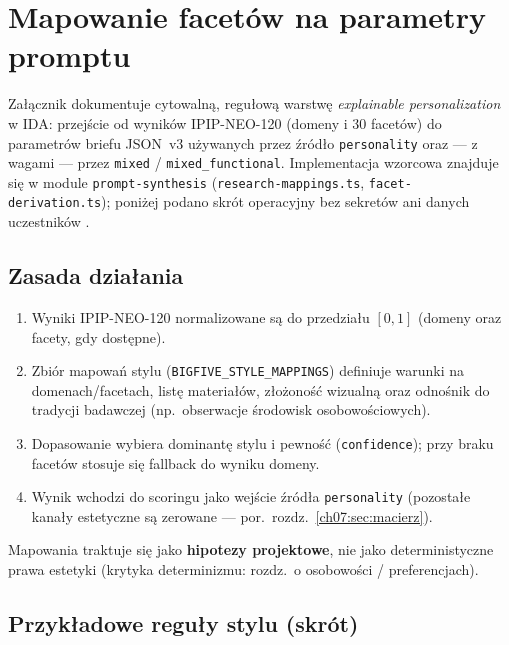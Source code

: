 \chapter{Mapowanie facetów na parametry promptu}
\label{app:c:top}

Załącznik dokumentuje cytowalną, regułową warstwę \emph{explainable personalization} w IDA: przejście od wyników IPIP-NEO-120 (domeny i 30 facetów) do parametrów briefu JSON~v3 używanych przez źródło \texttt{personality} oraz --- z wagami --- przez \texttt{mixed} / \texttt{mixed\_functional}. Implementacja wzorcowa znajduje się w module \texttt{prompt-synthesis} (\texttt{research-mappings.ts}, \texttt{facet-derivation.ts}); poniżej podano skrót operacyjny bez sekretów ani danych uczestników \parencite{idaPlatform2026}.

\section{Zasada działania}
\label{app:c:sec:zasada}

\begin{enumerate}
  \item Wyniki IPIP-NEO-120 normalizowane są do przedziału $[0,1]$ (domeny oraz facety, gdy dostępne).
  \item Zbiór mapowań stylu (\texttt{BIGFIVE\_STYLE\_MAPPINGS}) definiuje warunki na domenach/facetach, listę materiałów, złożoność wizualną oraz odnośnik do tradycji badawczej (np.\ obserwacje środowisk osobowościowych).
  \item Dopasowanie wybiera dominantę stylu i pewność (\texttt{confidence}); przy braku facetów stosuje się fallback do wyniku domeny.
  \item Wynik wchodzi do scoringu jako wejście źródła \texttt{personality} (pozostałe kanały estetyczne są zerowane --- por.\ rozdz.~\ref{ch07:sec:macierz}).
\end{enumerate}

Mapowania traktuje się jako \textbf{hipotezy projektowe}, nie jako deterministyczne prawa estetyki (krytyka determinizmu: rozdz.~o osobowości / preferencjach).

\section{Przykładowe reguły stylu (skrót)}
\label{app:c:sec:reguly}

